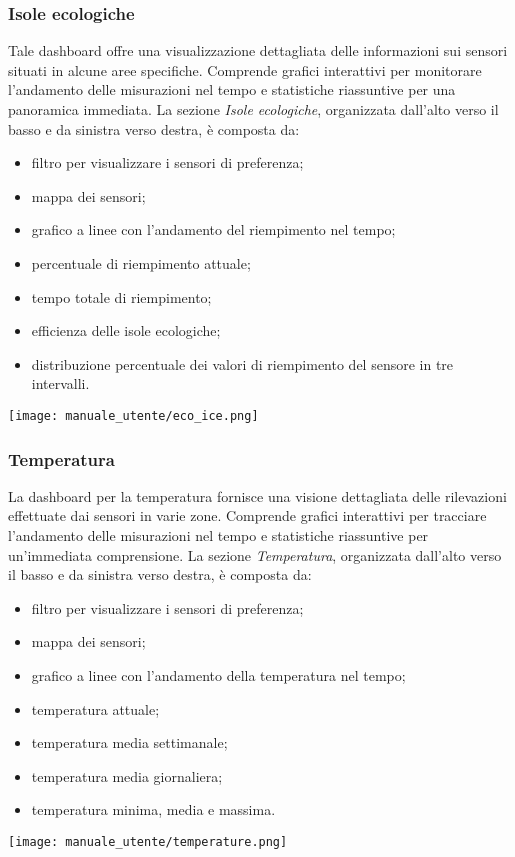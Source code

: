 \subsubsection{Isole ecologiche}
Tale dashboard offre una visualizzazione dettagliata delle informazioni sui sensori situati in alcune aree specifiche. Comprende grafici interattivi per monitorare l'andamento delle misurazioni nel tempo e statistiche riassuntive per una panoramica immediata. La sezione \textit{Isole ecologiche}, organizzata dall'alto verso il basso e da sinistra verso destra, è composta da:
\begin{itemize}
    \item filtro per visualizzare i sensori di preferenza;
    \item mappa dei sensori;
    \item grafico a linee con l'andamento del riempimento nel tempo;
    \item percentuale di riempimento attuale;
    \item tempo totale di riempimento;
    \item efficienza delle isole ecologiche;
    \item distribuzione percentuale dei valori di riempimento del sensore in tre intervalli.
\end{itemize}
\begin{center}
    \texttt{[image: manuale\_utente/eco\_ice.png]}
\end{center}

\subsubsection{Temperatura}
La dashboard per la temperatura fornisce una visione dettagliata delle rilevazioni effettuate dai sensori in varie zone. Comprende grafici interattivi per tracciare l'andamento delle misurazioni nel tempo e statistiche riassuntive per un'immediata comprensione. La sezione \textit{Temperatura}, organizzata dall'alto verso il basso e da sinistra verso destra, è composta da:
\begin{itemize}
    \item filtro per visualizzare i sensori di preferenza;
    \item mappa dei sensori;
    \item grafico a linee con l'andamento della temperatura nel tempo;
    \item temperatura attuale;
    \item temperatura media settimanale;
    \item temperatura media giornaliera;
    \item temperatura minima, media e massima.
\end{itemize}
\begin{center}
    \texttt{[image: manuale\_utente/temperature.png]}
\end{center}

